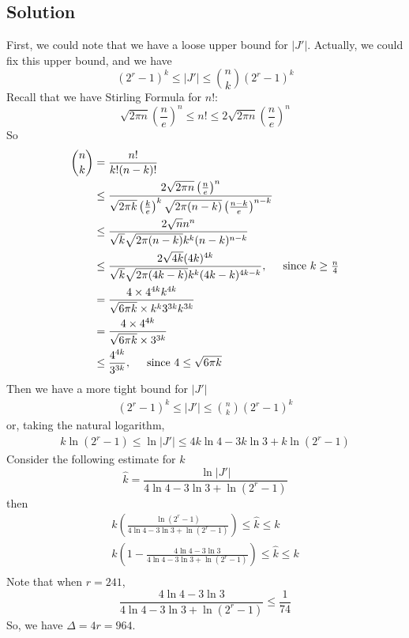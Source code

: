 \documentclass{article}
\begin{document}
\subsection{Solution}
First, we could note that we have a loose upper bound for $|J'|$.
Actually, we could fix this upper bound, and we have
\[(2^r - 1)^k \leq |J'| \leq \binom{n}{k}(2^r - 1)^k\]
Recall that we have Stirling Formula for $n!$:
\[\sqrt{2\pi n}\left(\frac{n}{e}\right)^n \leq n! \leq 2\sqrt{2\pi n}\left(\frac{n}{e}\right)^n\]
So
\begin{align*}
  \binom{n}{k} &= \frac{n!}{k!(n-k)!} \\
  &\leq \frac{2\sqrt{2\pi n}\left(\frac{n}{e}\right)^n}{\sqrt{2\pi k}\left(\frac{k}{e}\right)^k \sqrt{2\pi(n-k)}\left(\frac{n-k}{e}\right)^{n-k}} \\
  &\leq \frac{2\sqrt{n}n^n}{\sqrt{k}\sqrt{2\pi(n-k)}k^k (n-k)^{n-k}}\\
  &\leq \frac{2\sqrt{4k}(4k)^{4k}}{\sqrt{k}\sqrt{2\pi(4k-k)}k^k (4k-k)^{4k-k}}, \hspace{0.5cm} \mbox{since $k \geq \frac{n}{4}$}\\
  &= \frac{4\times 4^{4k}k^{4k}}{\sqrt{6\pi k}\times k^k 3^{3k} k^{3k}} \\
  &= \frac{4\times 4^{4k}}{\sqrt{6\pi k}\times 3^{3k} } \\
  &\leq \frac{4^{4k}}{3^{3k}}, \hspace{0.5cm} \mbox{since $4\leq \sqrt{6\pi k}$}
\end{align*}
Then we have a more tight bound for $|J'|$
\begin{align*}
  (2^r - 1)^k \leq |J'| \leq \binom{n}{k}(2^r - 1)^k 
\end{align*}
or, taking the natural logarithm,
\begin{align*}
  k\ln(2^r - 1) \leq \ln|J'| \leq 4k\ln4 - 3k\ln3 + k\ln(2^r - 1)
\end{align*}
Consider the following estimate for $k$
\[\hat{k} = \frac{\ln|J'|}{4\ln4 - 3\ln3 + \ln(2^r - 1)}\]
then
\begin{align*}
  k(\frac{\ln(2^r - 1)}{4\ln4-3\ln3+\ln(2^r -1)}) \leq \hat{k} \leq k \\
  k(1-\frac{4\ln4-3\ln3}{4\ln4-3\ln3+\ln(2^r -1)}) \leq \hat{k} \leq k \\
\end{align*}
Note that when $r = 241$,
\[\frac{4\ln4 - 3\ln3}{4\ln4 - 3\ln3 + \ln(2^r - 1)} \leq \frac{1}{74}\]
So, we have $\Delta = 4r = 964$.
\end{document}
